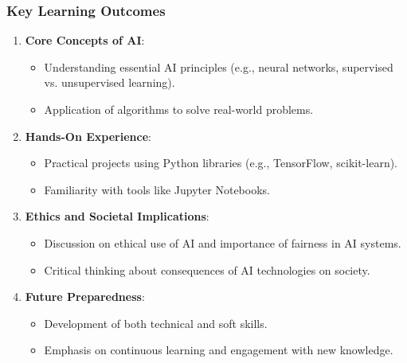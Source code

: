 \documentclass[aspectratio=169]{beamer}
\begin{document}
\begin{frame}[fragile]
    \frametitle{Key Learning Outcomes}
    \begin{enumerate}
        \item \textbf{Core Concepts of AI}:
            \begin{itemize}
                \item Understanding essential AI principles (e.g., neural networks, supervised vs. unsupervised learning).
                \item Application of algorithms to solve real-world problems.
            \end{itemize}
        \item \textbf{Hands-On Experience}:
            \begin{itemize}
                \item Practical projects using Python libraries (e.g., TensorFlow, scikit-learn).
                \item Familiarity with tools like Jupyter Notebooks.
            \end{itemize}
        \item \textbf{Ethics and Societal Implications}:
            \begin{itemize}
                \item Discussion on ethical use of AI and importance of fairness in AI systems.
                \item Critical thinking about consequences of AI technologies on society.
            \end{itemize}
        \item \textbf{Future Preparedness}:
            \begin{itemize}
                \item Development of both technical and soft skills.
                \item Emphasis on continuous learning and engagement with new knowledge.
            \end{itemize}
    \end{enumerate}
\end{frame}
\end{document}
